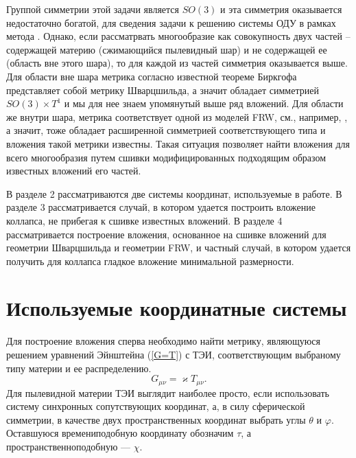 \documentclass[12pt]{article}
\begin{document}
Группой симметрии этой задачи является $SO(3)$ и эта симметрия оказывается недостаточно богатой, для сведения задачи
к решению системы ОДУ в рамках метода \cite{statja27}. Однако, если рассматрвать многообразие как совокупность двух частей --
содержащей материю (сжимающийся пылевидный шар) и не содержащей ее (область вне этого шара), то для каждой
из частей симметрия оказывается выше. Для области вне шара метрика согласно известной теореме Биркгофа
представляет собой метрику Шварцшильда, а значит обладает симметрией $SO(3)\times T^1$ и мы для нее знаем
упомянутый выше ряд вложений. Для области же внутри шара, метрика соответствует одной из моделей FRW, см., например, \cite{landavshic2},
а значит, тоже обладает расширенной симметрией соответствующего типа и вложения такой метрики известны.
Такая ситуация позволяет найти вложения для всего многообразия путем сшивки модифицированных подходящим образом
известных вложений его частей.

В разделе 2 рассматриваются две системы координат, используемые в работе. В разделе 3 рассматривается случай, в котором удается построить вложение коллапса, не прибегая к сшивке известных вложений. В разделе 4 рассматривается построение вложения, основанное на сшивке вложений для геометрии Шварцшильда и геометрии FRW, и частный случай, в котором удается получить для коллапса гладкое вложение минимальной размерности.

\section{Используемые координатные системы}
Для построение вложения сперва необходимо найти метрику, являющуюся решением уравнений Эйнштейна (\ref{G=T}) с ТЭИ, соответствующим выбраному типу материи и ее распределению.
\begin{equation}
\label{G=T}
	G_{\mu \nu} = \varkappa T_{\mu \nu}.
\end{equation}
Для пылевидной материи ТЭИ выглядит наиболее просто, если использовать систему синхронных сопутствующих координат, а, в силу сферической симметрии, в качестве двух пространственных координат выбрать углы $\theta$ и $\varphi$. Оставшуюся времениподобную координату обозначим $\tau$, а пространственноподобную --- $\chi$. 
\end{document}
